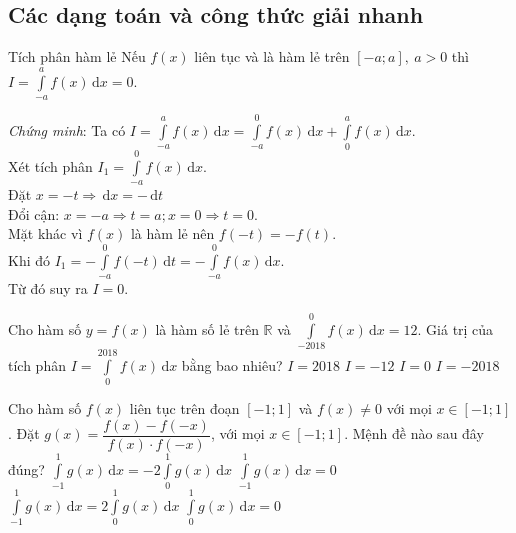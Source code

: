 \subsection{Các dạng toán và công thức giải nhanh}
\begin{dang}{Tích phân hàm lẻ}
Nếu $f(x)$ liên tục và là hàm lẻ trên $\left[-a;a\right],\ a>0$ thì $I=\displaystyle\int\limits_{-a}^{a}f(x)\mathrm{\,d}x=0$.\\
\end{dang}
\noindent
\emph{Chứng minh}: 	Ta có $I=\displaystyle\int\limits_{-a}^{a}f(x)\mathrm{\,d}x=\displaystyle\int\limits_{-a}^{0}f(x)\mathrm{\,d}x+\displaystyle\int\limits_{0}^{a}f(x)\mathrm{\,d}x$.\\
		Xét tích phân $I_1=\displaystyle\int\limits_{-a}^{0}f(x)\mathrm{\,d}x$.\\
		Đặt $x=-t\Rightarrow \mathrm{\,d}x=-\mathrm{\,d}t$\\
		Đổi cận: $x=-a\Rightarrow t=a; x=0\Rightarrow t=0$.\\
		Mặt khác vì $f(x)$ là hàm lẻ nên $f(-t)=-f(t)$.\\
		Khi đó $I_1=-\displaystyle\int\limits_{-a}^{0}f(-t)\mathrm{\,d}t=-\displaystyle\int\limits_{-a}^{0}f(x)\mathrm{\,d}x$.\\
		Từ đó suy ra $I=0$.
\begin{vd}%
		Cho hàm số $y=f(x)$ là hàm số lẻ trên $\mathbb{R}$ và $\displaystyle\int\limits_{-2018}^0f(x)\mathrm{\,d}x=12$. Giá trị của tích phân $I=\displaystyle\int\limits_0^{2018}f(x)\mathrm{\,d}x$ bằng bao nhiêu?
		\choice
		{$I=2018$}
		{\True $I=-12$}
		{$I=0$}
		{$I=-2018$}
\end{vd}
\begin{vd}%
Cho hàm số $f(x)$ liên tục trên đoạn $[-1;1]$ và $f(x) \neq 0$ với mọi $x \in [-1;1]$. Đặt $g(x) = \dfrac{f(x) - f(-x)}{f(x) \cdot f(-x)}$, với mọi $x \in [-1;1]$. Mệnh đề nào sau đây đúng?
\choice
{$\displaystyle\int\limits_{-1}^{1} g(x) \mathrm{\,d}x = -2\displaystyle\int\limits_{0}^{1} g(x) \mathrm{\,d}x$}
{\True $\displaystyle\int\limits_{-1}^{1} g(x) \mathrm{\,d}x =0$}
{$\displaystyle\int\limits_{-1}^{1} g(x) \mathrm{\,d}x = 2\displaystyle\int\limits_{0}^{1} g(x) \mathrm{\,d}x$}
{$\displaystyle\int\limits_{0}^{1} g(x) \mathrm{\,d}x =0$}
\end{vd}
